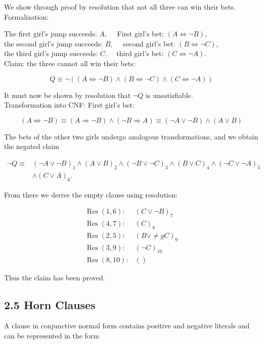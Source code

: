 \documentclass[10pt]{article}
\begin{document}
We show through proof by resolution that not all three can win their bets.\\
Formalization:

The first girl's jump succeeds: $A, \quad$ First girl's bet: $(A \Leftrightarrow \neg B)$,\\
the second girl's jump succeeds: $B, \quad$ second girl's bet: $(B \Leftrightarrow \neg C)$,\\
the third girl's jump succeeds: $C . \quad$ third girl's bet: $(C \Leftrightarrow \neg A)$.\\
Claim: the three cannot all win their bets:

$$
Q \equiv \neg((A \Leftrightarrow \neg B) \wedge(B \Leftrightarrow \neg C) \wedge(C \Leftrightarrow \neg A))
$$

It must now be shown by resolution that $\neg Q$ is unsatisfiable.\\
Transformation into CNF: First girl's bet:

$$
(A \Leftrightarrow \neg B) \equiv(A \Rightarrow \neg B) \wedge(\neg B \Rightarrow A) \equiv(\neg A \vee \neg B) \wedge(A \vee B)
$$

The bets of the other two girls undergo analogous transformations, and we obtain the negated claim

$$
\begin{aligned}
\neg Q \equiv & (\neg A \vee \neg B)_{1} \wedge(A \vee B)_{2} \wedge(\neg B \vee \neg C)_{3} \wedge(B \vee C)_{4} \wedge(\neg C \vee \neg A)_{5} \\
& \wedge(C \vee A)_{6} .
\end{aligned}
$$

From there we derive the empty clause using resolution:

$$
\begin{array}{ll}
\operatorname{Res}(1,6): & (C \vee \neg B)_{7} \\
\operatorname{Res}(4,7): & (C)_{8} \\
\operatorname{Res}(2,5): & (B \vee \ne
g C)_{9} \\
\operatorname{Res}(3,9): & (\neg C)_{10} \\
\operatorname{Res}(8,10): & ()
\end{array}
$$

Thus the claim has been proved.

\subsection*{2.5 Horn Clauses}
A clause in conjunctive normal form contains positive and negative literals and can be represented in the form
\end{document}
